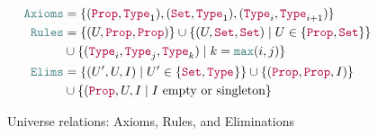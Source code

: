\begin{figure}
\centering
\begin{align*}
\Axioms
    &= \set{(\Prop, \Type{1}), (\Set, \Type{1}), (\Type{i}, \Type{i+1})} \\
\Rules
    &= \set{(U, \Prop, \Prop)}
    \cup \set{(U, \Set, \Set) \mid U \in \set{\Prop, \Set}} \\
    &\cup \set{(\Type{i}, \Type{j}, \Type{k}) \mid k = \meta{max}(i, j)} \\
\Elims
    &= \set{(U', U, I) \mid U' \in \set{\Set, \Type{}}}
    \cup \set{(\Prop, \Prop, I)} \\
    &\cup \set{(\Prop, U, I \mid \text{$I$ empty or singleton}}
\end{align*}
\caption{Universe relations: Axioms, Rules, and Eliminations}
\label{fig:axruel}
\end{figure}

